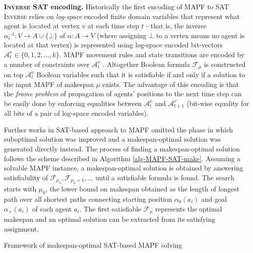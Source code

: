 \documentclass[jair,oneside,11pt]{article}
\begin{document}
{\bf \textsc{Inverse} SAT encoding.} Historically the first encoding of MAPF to SAT \textsc{Inverse} relies on {\em log-space} encoded finite domain variables \cite{DBLP:books/sp/Petke15} that represent what agent is located at vertex $v$ at each time step $t$ - that is, the inverse $\alpha_t^{-1}:V \rightarrow A \cup \{\bot\}$ of $\alpha:A \rightarrow V$ (where assigning $\bot$ to a vertex means no agent is located at that vertex) is represented using log-space encoded bit-vectors $\mathcal{A}_t^{v} \in \{0,1,2,...,k\}$. MAPF movement rules and state transitions are encoded by a number of constraints over $\mathcal{A}_t^{v}$ \cite{DBLP:conf/pricai/Surynek12}. Altogether Boolean formula $\mathcal{F}_{\mu}$ is constructed on top $\mathcal{A}_t^{v}$ Boolean variables such that it is satisfiable if and only if a solution to the input MAPF of makespan $\mu$ exists. The advantage of this encoding is that the {\em frame problem} \cite{McCHay69} of propagation of agents' positions to the next time step can be easily done by enforcing equalities between $\mathcal{A}_t^{v}$ and $\mathcal{A}_{t+1}^{v}$ (bit-wise equality for all bits of a pair of log-space encoded variables).

Further works in SAT-based approach to MAPF \cite{DBLP:conf/iros/Surynek13,DBLP:conf/sara/Surynek13} omitted the phase in which suboptimal solution was improved and a makespan-optimal solution was generated directly instead. The process of finding a makespan-optimal solution follows the scheme described in Algorithm \ref{alg-MAPF-SAT-make}. Assuming a solvable MAPF instance, a makespan-optimal solution is obtained by answering satisfiability of $\mathcal{F}_{\mu_0},\mathcal{F}_{\mu_0+1}, ...$ until a satisfiable formula is found. The search starts with $\mu_0$, the lower bound on makespan obtained as the length of longest path over all shortest paths connecting starting position $\alpha_0(a_i)$ and goal $\alpha_+(a_i)$ of each agent $a_i$. The first satisfiable $\mathcal{F}_{\mu}$ represents the optimal makespan and an optimal solution can be extracted from its satisfying assignment.

\begin{algorithm}[t]
\begin{footnotesize}
  \caption{Framework of makespan-optimal SAT-based MAPF solving}
\label{alg-MAPF-SAT-make}
\end{footnotesize}
\end{algorithm}
\end{document}
